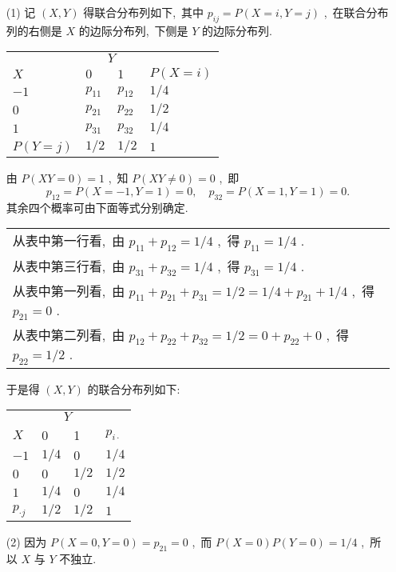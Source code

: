    \begin{solution}
   	\begin{itemize}
   		\item[(1)] 记 $(X,Y)$ 得联合分布列如下,\ 其中 $p_{ij}=P(X=i,Y=j)$ ,\ 在联合分布列的右侧是 $X$ 的边际分布列,\ 下侧是 $Y$ 的边际分布列.
   		\begin{center}
   			\begin{tabularx}{0.8\textwidth}{XXXX}
   				\toprule
   				 & \multicolumn{2}{c}{$Y$} & \\
   				\cmidrule{2-3}
   				$X$ & $0$ & $1$ & $P(X=i)$\\
   				\midrule
   				$-1$ & $p_{11}$ & $p_{12}$ & $1/4$\\
   				$0$ & $p_{21}$ & $p_{22}$ & $1/2$\\
   				$1$ & $p_{31}$ & $p_{32}$ & $1/4$\\
   				\midrule
   				$P(Y=j)$ & $1/2$ & $1/2$ & $1$\\
   				\bottomrule
   			\end{tabularx}
   		\end{center}
   		由 $P(XY=0)=1$ ,\ 知 $P(XY\ne0)=0$ ,\ 即
   		\begin{equation*}
   		p_{12}=P(X=-1,Y=1)=0,\quad p_{32}=P(X=1,Y=1)=0.
   		\end{equation*}
   		其余四个概率可由下面等式分别确定.
   		\begin{center}
   			\begin{tabular}{l}
   				从表中第一行看,\ 由 $p_{11}+p_{12}=1/4$ ,\ 得 $p_{11}=1/4$ .\\
   				从表中第三行看,\ 由 $p_{31}+p_{32}=1/4$ ,\ 得 $p_{31}=1/4$ .\\
   				从表中第一列看,\ 由 $p_{11}+p_{21}+p_{31}=1/2=1/4+p_{21}+1/4$ ,\ 得 $p_{21}=0$ .\\
   				从表中第二列看,\ 由 $p_{12}+p_{22}+p_{32}=1/2=0+p_{22}+0$ ,\ 得 $p_{22}=1/2$ .
   			\end{tabular}
   		\end{center}
   		
   		于是得 $(X,Y)$ 的联合分布列如下:
   		\begin{center}
   			\begin{tabularx}{0.8\textwidth}{XXXX}
   				\toprule
   				 & \multicolumn{2}{c}{$Y$} & \\
   				\cmidrule{2-3}
   				$X$ & 0 & 1 & $p_{i\cdot}$\\
   				\midrule
   				$-1$ & $1/4$ & $0$ & $1/4$\\
   				$0$ & $0$ & $1/2$ & $1/2$\\
   				$1$ & $1/4$ & $0$ & $1/4$\\
   				\midrule
   				$p_{\cdot j}$ & $1/2$ & $1/2$ & $1$\\
   				\bottomrule
   			\end{tabularx}
   		\end{center}
   		\item[(2)] 因为 $P(X=0,Y=0)=p_{21}=0$ ,\ 而 $P(X=0)P(Y=0)=1/4$ ,\ 所以 $X$ 与 $Y$ 不独立.
   	\end{itemize}
   \end{solution}

